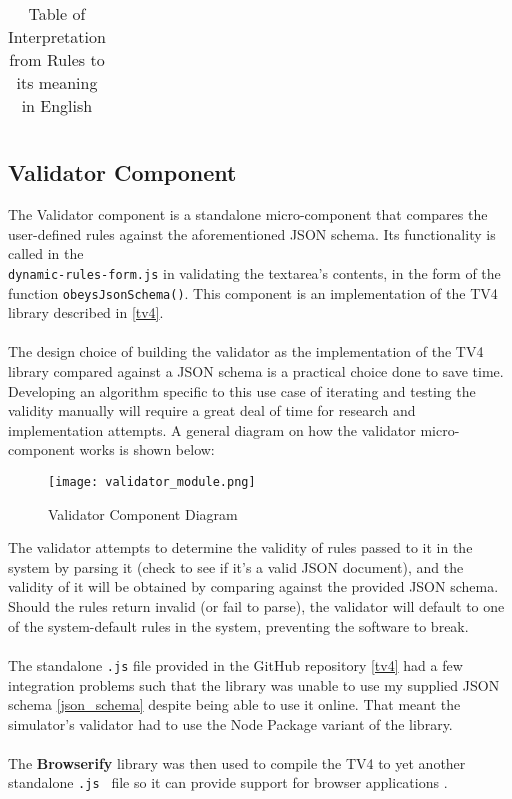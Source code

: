 \begin{table}[H]
\begin{tabular}{|l|l|}
\end{tabular}
\caption{Table of Interpretation from Rules to its meaning in English}
\label{rules_to_english_table}
\end{table}
\newpage
\subsection{Validator Component} \label{validator}
The Validator component is a standalone micro-component that compares the user-defined rules against the aforementioned JSON schema. Its functionality is called in the \\ \texttt{dynamic-rules-form.js} in validating the textarea's contents, in the form of the function \texttt{obeysJsonSchema()}. This component is an implementation of the TV4 library described in \ref{tv4}. 
\\ \\
The design choice of building the validator as the implementation of the TV4 library compared against a JSON schema is a practical choice done to save time. Developing an algorithm specific to this use case of iterating and testing the validity manually will require a great deal of time for research and implementation attempts. A general diagram on how the validator micro-component works is shown below:
\\
\begin{figure}[H]
    \caption{Validator Component Diagram}
    \centering
    \texttt{[image: validator\_module.png]}
\end{figure}
\noindent The validator attempts to determine the validity of rules passed to it in the system by parsing it (check to see if it's a valid JSON document), and the validity of it will be obtained by comparing against the provided JSON schema. Should the rules return invalid (or fail to parse), the validator will default to one of the system-default rules in the system, preventing the software to break.
\\ \\
The standalone \texttt{.js} file provided in the GitHub repository \ref{tv4} had a few integration problems such that the library was unable to use my supplied JSON schema \ref{json_schema} despite being able to use it online. That meant the simulator's validator had to use the Node Package variant of the library. 
\\ \\
The \textbf{Browserify} library was then used to compile the TV4 to yet another standalone \texttt{.js } file so it can provide support for browser applications \cite{browserify}.
\newpage

